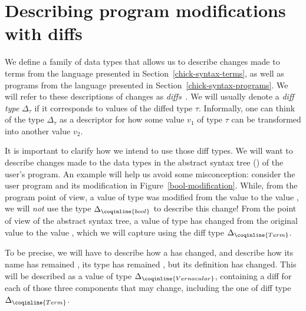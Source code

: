 \section{Describing program modifications with diffs}\label{chick-diffs}

We define a family of data types that allows us to describe changes made to
terms from the language presented in Section~\ref{chick-syntax-terms}, as well
as programs from the language presented in Section~\ref{chick-syntax-programs}.
We will refer to these descriptions of changes as
\textit{diffs}~\footnotemark{}.  We will usually denote a \textit{diff type}
$\Delta_{\tau}$ if it corresponds to values of the diffed type $\tau$.
Informally, one can think of the type $\Delta_{\tau}$ as a descriptor for how
some value $v_{1}$ of type $\tau$ can be transformed into another value $v_{2}$.


It is important to clarify how we intend to use those diff types.  We will want
to describe changes made to the data types in the abstract syntax tree
() of the user's program.  An example will help us avoid some
misconception: consider the user program and its modification in
Figure~\ref{bool-modification}.  While, from the program point of view, a value
of type  was modified from the value  to the
value , we will \emph{not} use the type
$\Delta_{\coqinline{bool}}$ to describe this change!  From the point of view of
the abstract syntax tree, a value of type  has changed from the
original value  to the value ,
which we will capture using the diff type $\Delta_{\coqinline{Term}}$.

To be precise, we will have to describe how a  has
changed, and describe how its name has remained , its type has
remained , but its definition has changed.  This will be
described as a value of type $\Delta_{\coqinline{Vernacular}}$, containing a
diff for each of those three components that may change, including the one of
diff type $\Delta_{\coqinline{Term}}$.

